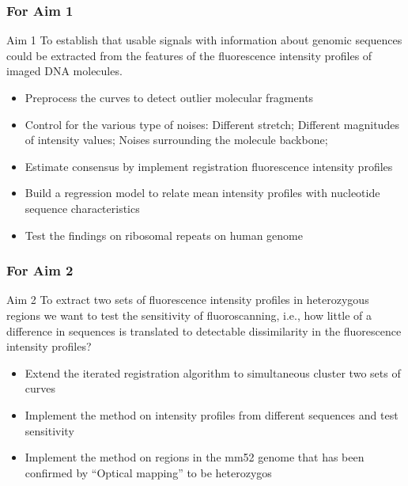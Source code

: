 \documentclass[10pt,dvipsnames,table]{beamer}
\begin{document}

\begin{frame}
\frametitle{For Aim 1}
\begin{block}{Aim 1}
To establish that usable signals with information about genomic sequences could be extracted from the features of the fluorescence intensity profiles of imaged DNA molecules.
\end{block}
\begin{itemize}
\item[\checkmark] Preprocess the curves to detect outlier molecular fragments
\item[\checkmark] Control for the various type of noises: Different stretch; Different magnitudes of intensity values; Noises surrounding the molecule backbone; 
\item[\checkmark] Estimate consensus by implement registration fluorescence intensity profiles
\item Build a regression model to relate mean intensity profiles with nucleotide sequence characteristics
\item Test the findings on ribosomal repeats on human genome
\end{itemize}
\end{frame}


\begin{frame}
\frametitle{For Aim 2}
\begin{block}{Aim 2}
To extract two sets of fluorescence intensity profiles in heterozygous regions we want to test the sensitivity of fluoroscanning, i.e., how little of a difference in sequences is translated to detectable dissimilarity in the fluorescence intensity profiles?
\end{block}
\begin{itemize}
\item Extend the iterated registration algorithm to simultaneous cluster two sets of curves
\item Implement the method on intensity profiles from different sequences and test sensitivity
\item Implement the method on regions in the mm52 genome that has been confirmed by ``Optical mapping'' to be heterozygos
\end{itemize}
\end{frame}
\end{document}
